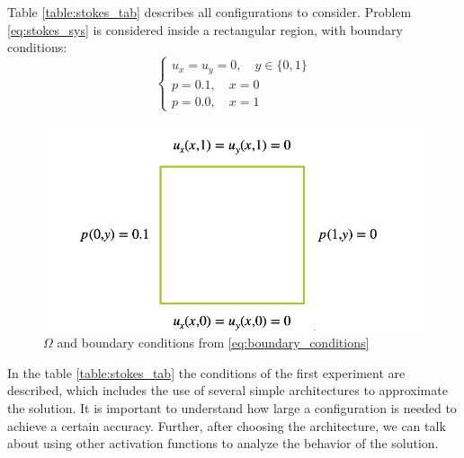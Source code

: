 Table \ref{table:stokes_tab} describes all configurations to consider. Problem \eqref{eq:stokes_sys} is considered inside a rectangular region, with boundary conditions:
\begin{equation}
	\label{eq:boundary_conditions}
	\begin{cases}
		u_x = u_y = 0, \quad y \in \{0, 1\} \\
		p = 0.1, \quad x = 0 \\
		p = 0.0, \quad x = 1
	\end{cases}
\end{equation}

\begin{figure}
	\centering
	\includegraphics[width=\textwidth]{images/chapter3/stokes_description.png}
	\caption{$\Omega$ and boundary conditions from \eqref{eq:boundary_conditions}}
	\label{fig:stokes_description}\tabularnewline
\end{figure}

In the table \ref{table:stokes_tab} the conditions of the first experiment are described, which includes the use of several simple architectures to approximate the solution. It is important to understand how large a configuration is needed to achieve a certain accuracy. Further, after choosing the architecture, we can talk about using other activation functions to analyze the behavior of the solution.


